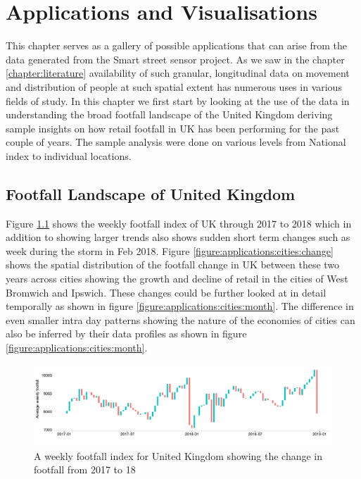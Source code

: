 \chapter{Applications and Visualisations} \label{chapter:application}

This chapter serves as a gallery of possible applications that can arise from the data generated from the Smart street sensor project.
As we saw in the chapter \ref{chapter:literature} availability of such granular, longitudinal data on movement and distribution of people at such spatial extent has numerous uses in various fields of study.
In this chapter we first start by looking at the use of the data in understanding the broad footfall landscape of the United Kingdom deriving sample insights on how retail footfall in UK has been performing for the past couple of years.
The sample analysis were done on various levels from National index to individual locations.

\section{Footfall Landscape of United Kingdom}
Figure \ref{figure:applications:footfall:index} shows the weekly footfall index of UK through 2017 to 2018 which in addition to showing larger trends also shows sudden short term changes such as week during the storm in Feb 2018. Figure \ref{figure:applications:cities:change} shows the spatial distribution of the footfall change in UK between these two years across cities showing the growth and decline of retail in the cities of West Bromwich and Ipswich. These changes could be further looked at in detail temporally as shown in figure \ref{figure:applications:cities:month}. The difference in even smaller intra day patterns showing the nature of the economies of cities can also be inferred by their data profiles as shown in figure \ref{figure:applications:cities:month}.

\begin{figure}
  \includegraphics[trim={0 25 0 10},clip]{images/applications-footfall-index.png}
  \caption{A weekly footfall index for United Kingdom showing the change in footfall from 2017 to 18}
  \label{figure:applications:footfall:index}
\end{figure}

